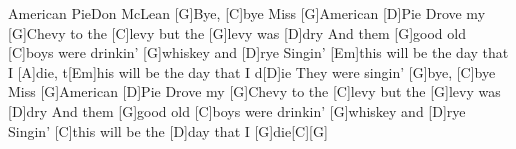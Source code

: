 \documentclass[../main.tex]{subfiles}
\begin{document}
\begin{song}{American Pie}{Don McLean}{}
[G]Bye, [C]bye Miss [G]American [D]Pie
Drove my [G]Chevy to the [C]levy but the [G]levy was [D]dry
And them [G]good old [C]boys were drinkin' [G]whiskey and [D]rye
Singin' [Em]this will be the day that I [A]die, t[Em]his will be the day that I d[D]ie
They were singin' [G]bye, [C]bye Miss [G]American [D]Pie
Drove my [G]Chevy to the [C]levy but the [G]levy was [D]dry
And them [G]good old [C]boys were drinkin' [G]whiskey and [D]rye
Singin' [C]this will be the [D]day that I [G]die[C]{\hh}[G]{\hh}

\end{song}
\end{document}
